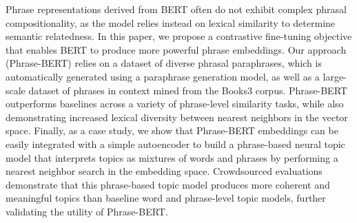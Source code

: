 Phrase representations derived from BERT often do not exhibit complex phrasal compositionality, as the model relies instead on lexical similarity to determine semantic relatedness. In this paper, we propose a contrastive fine-tuning objective that enables BERT to produce more powerful phrase embeddings. Our approach (Phrase-BERT) relies on a dataset of diverse phrasal paraphrases, which is automatically generated using a paraphrase generation model, as well as a large-scale dataset of phrases in context mined from the Books3 corpus. Phrase-BERT outperforms baselines across a variety of phrase-level similarity tasks, while also demonstrating increased lexical diversity between nearest neighbors in the vector space. Finally, as a case study, we show that Phrase-BERT embeddings can be easily integrated with a simple autoencoder to build a phrase-based neural topic model that interprets topics as mixtures of words and phrases by performing a nearest neighbor search in the embedding space. Crowdsourced evaluations demonstrate that this phrase-based topic model produces more coherent and meaningful topics than baseline word and phrase-level topic models, further validating the utility of Phrase-BERT.
